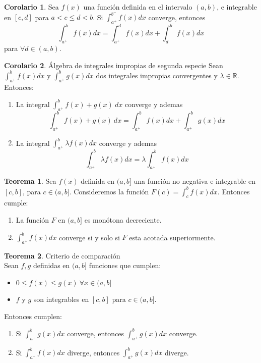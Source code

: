 \documentclass[10pt]{article}
\theoremstyle{definition}
\newtheorem{theorem}{Teorema}[section]
\newtheorem{corollary}{Corolario}[theorem]
\begin{document}
\begin{corollary}
	Sea $f(x)$ una función definida en el intervalo $(a,b)$, e integrable en $[c,d]$ para $a<c\le d<b$. Si $\int_{a^+}^{b^-} f(x) dx$ converge, entonces $$\int_{a^+}^{b^-} f(x) dx=\int_{a^+}^{d} f(x) dx + \int_{d}^{b^-} f(x) dx$$
	para $\forall d\in (a,b)$.
\end{corollary}
\begin{corollary}{Álgebra de integrales impropias de segunda especie}
	Sean $\int_{a^+}^{b} f(x) dx$ y $\int_{a^+}^{b} g(x) dx$ dos integrales impropias convergentes y $\lambda\in\mathbb{R}$. Entonces:
	\begin{enumerate}
		\item La integral $\int_{a^+}^{b} f(x)+g(x)\ dx$ converge y ademas $$\int_{a^+}^{b} f(x)+g(x)\ dx=\int_{a^+}^{b} f(x) dx+\int_{a^+}^{b} g(x) dx$$
		\item La integral $\int_{a^+}^{b} \lambda f(x) dx$ converge y ademas $$\int_{a^+}^{b} \lambda f(x) dx=\lambda \int_{a^+}^{b} f(x) dx$$
	\end{enumerate}
\end{corollary}
\begin{theorem}
	Sea $f(x)$ definida en $(a,b]$ una función no negativa e integrable en $[c,b]$, para $c\in (a,b]$. Consideremos la función $F(c)=\int_{c}^{b} f(x) dx$. Entonces cumple:
	\begin{enumerate}
		\item La función $F$ en $(a,b]$ es monótona decreciente.
		\item $\int_{a^+}^{b} f(x) dx$ converge si y solo si $F$ esta acotada superiormente.
	\end{enumerate}
\end{theorem}
\newpage\begin{theorem}{Criterio de comparación}
    \\Sean $f,g$ definidas en $(a,b]$ funciones que cumplen:
    \begin{itemize}
        \item $0\le f(x)\le g(x)\ \forall x\in (a,b]$
        \item $f$ y $g$ son integrables en $[c,b]$ para $c\in (a,b]$.
    \end{itemize}
    Entonces cumplen:
    \begin{enumerate}
        \item Si $\int_{a^+}^{b} g(x) dx$ converge, entonces $\int_{a^+}^{b} g(x) dx$ converge.
        \item Si $\int_{a^+}^{b} f(x) dx$ diverge, entonces $\int_{a^+}^{b} g(x) dx$ diverge.
    \end{enumerate}
\end{theorem}
\end{document}
